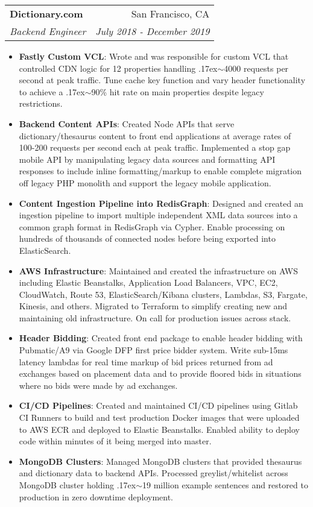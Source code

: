 \documentclass[letterpaper,11pt]{article}
\makeatletter
\newcommand{\resumeItem}[2]{
  \item\small{
    \textbf{#1}{: #2 \vspace{-2pt}}
  }
}
\newcommand{\resumeSubheading}[4]{
  \vspace{-1pt}\item
    \begin{tabular*}{0.97\textwidth}[t]{l@{\extracolsep{\fill}}r}
      \textbf{#1} & #2 \\
      \textit{\small#3} & \textit{\small #4} \\
    \end{tabular*}\vspace{-5pt}
}
\newcommand{\resumeItemListStart}{\begin{itemize}}
\newcommand{\resumeItemListEnd}{\end{itemize}\vspace{-5pt}}
\makeatother
\begin{document}
    \resumeSubheading
      {Dictionary.com}{San Francisco, CA}
      {Backend Engineer}{July 2018 - December 2019}
      \resumeItemListStart
        \resumeItem{Fastly Custom VCL}
          {Wrote and was responsible for custom VCL that controlled CDN logic for 12 properties handling {\raise.17ex\hbox{$\scriptstyle\sim$}}4000 requests per second at peak traffic. Tune cache key function and vary header functionality to achieve a {\raise.17ex\hbox{$\scriptstyle\sim$}}90\% hit rate on main properties despite legacy restrictions.}
        \resumeItem{Backend Content APIs}
          {Created Node APIs that serve dictionary/thesaurus content to front end applications at average rates of 100-200 requests per second each at peak traffic. Implemented a stop gap mobile API by manipulating legacy data sources and formatting API responses to include inline formatting/markup to enable complete migration off legacy PHP monolith and support the legacy mobile application.}
         \resumeItem{Content Ingestion Pipeline into RedisGraph}
          {Designed and created an ingestion pipeline to import multiple independent XML data sources into a common graph format in RedisGraph via Cypher. Enable processing on hundreds of thousands of connected nodes before being exported into ElasticSearch. }
         \resumeItem{AWS Infrastructure}
          {Maintained and created the infrastructure on AWS including Elastic Beanstalks, Application Load Balancers, VPC, EC2, CloudWatch, Route 53, ElasticSearch/Kibana clusters, Lambdas, S3, Fargate, Kinesis, and others. Migrated to Terraform to simplify creating new and maintaining old infrastructure. On call for production issues across stack. }
         \resumeItem{Header Bidding}
          {Created front end package to enable header bidding with Pubmatic/A9 via Google DFP first price bidder system. Write sub-15ms latency lambdas for real time markup of bid prices returned from ad exchanges based on placement data and to provide floored bids in situations where no bids were made by ad exchanges. }
         \resumeItem{CI/CD Pipelines}
          {Created and maintained CI/CD pipelines using Gitlab CI Runners to build and test production Docker images that were uploaded to AWS ECR and deployed to Elastic Beanstalks. Enabled ability to deploy code within minutes of it being merged into master.}
         \resumeItem{MongoDB Clusters}
          {Managed MongoDB clusters that provided thesaurus and dictionary data to backend APIs. Processed greylist/whitelist across MongoDB cluster holding {\raise.17ex\hbox{$\scriptstyle\sim$}}19 million example sentences and restored to production in zero downtime deployment. }
      \resumeItemListEnd
\end{document}
